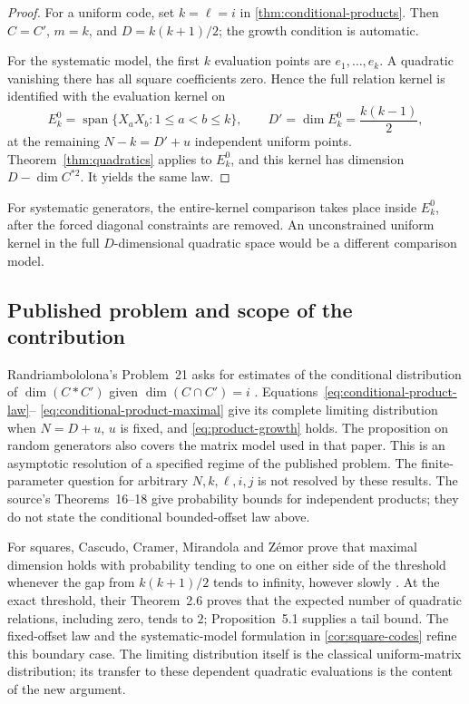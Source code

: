 \begin{proof}
For a uniform code, set $k=\ell=i$ in
\cref{thm:conditional-products}.  Then $C=C'$, $m=k$, and
$D=k(k+1)/2$; the growth condition is automatic.

For the systematic model, the first $k$ evaluation points are
$e_1,\ldots,e_k$.  A quadratic vanishing there has all square
coefficients zero.  Hence the full relation kernel is identified with
the evaluation kernel on
\[
 E_k^0=\operatorname{span}\{X_aX_b:1\le a<b\le k\},\qquad
 D'=\dim E_k^0=\frac{k(k-1)}2,
\]
at the remaining $N-k=D'+u$ independent uniform points.
Theorem~\ref{thm:quadratics} applies to $E_k^0$, and this kernel has
dimension $D-\dim C^{*2}$.  It yields the same law.
\end{proof}

For systematic generators, the entire-kernel comparison takes place
inside $E_k^0$, after the forced diagonal constraints are removed.
An unconstrained uniform kernel in the full $D$-dimensional quadratic
space would be a different comparison model.

\subsection{Published problem and scope of the contribution}
\label{subsec:code-literature}

Randriambololona's Problem~21 asks for estimates of the conditional
distribution of $\dim(C*C')$ given $\dim(C\cap C')=i$
\cite[Section~6, Problem~21]{Randriambololona2015}.
Equations~\eqref{eq:conditional-product-law}--
\eqref{eq:conditional-product-maximal} give its complete limiting
distribution when $N=D+u$, $u$ is fixed, and
\eqref{eq:product-growth} holds.  The proposition on random generators
also covers the matrix model used in that paper.  This is an asymptotic
resolution of a specified regime of the published problem.  The
finite-parameter question for arbitrary $N,k,\ell,i,j$ is not resolved
by these results.  The source's Theorems~16--18
give probability bounds for independent products; they do not state
the conditional bounded-offset law above.

For squares, Cascudo, Cramer, Mirandola and Z\'emor prove that maximal
dimension holds with probability tending to one on either side of the
threshold whenever the gap from $k(k+1)/2$ tends to infinity, however
slowly \cite[Theorems~2.2--2.3]{CCMZ2015}.  At the exact threshold,
their Theorem~2.6 proves that the expected number of quadratic relations,
including zero, tends to $2$; Proposition~5.1 supplies a tail bound.
The fixed-offset law and the systematic-model formulation in
\cref{cor:square-codes} refine this boundary case.  The limiting
distribution itself is the classical uniform-matrix distribution;
its transfer to these dependent quadratic evaluations is the content
of the new argument.

